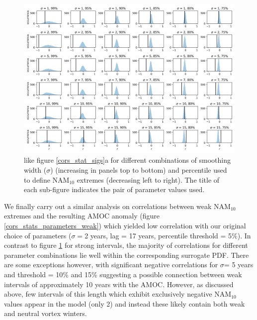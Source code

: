 \newpage
\begin{landscape}
\begin{figure}[h!]
\begin{center}
\noindent\includegraphics[width =0.9\linewidth]{Figures/Figures-surface/cors_sigs_thresh_and_sigma.png} 
\caption{like figure \ref{cors_stat_sigs}a for different combinations of smoothing width ($\sigma$) (increasing in panels top to bottom) and percentile used to define NAM$_{10}$ extremes (decreasing left to right). The title of each sub-figure indicates the pair of parameter values used.}%
\label{cors_stats_parameters_strong}
\end{center}
\end{figure}
\end{landscape}

We finally carry out a similar analysis on correlations between weak NAM$_{10}$ extremes and the resulting AMOC anomaly (figure \ref{cors_stats_parameters_weak}) which yielded low correlation with our original choice of parameters ($\sigma =$2 years, lag = 17 years, percentile threshold = 5\%). In contrast to figure \ref{cors_stats_parameters_strong} for strong intervals, the majority of correlations for different parameter combinations lie well within the corresponding surrogate PDF. There are some exceptions however, with significant negative correlations for $\sigma$= 5 years and threshold = 10\% and 15\% suggesting a possible connection between weak intervals of approximately 10 years with the AMOC. However, as discussed above, few intervals of this length which exhibit exclusively negative NAM$_{10}$ values appear in the model (only 2) and instead these likely contain both weak and neutral vortex winters. 

